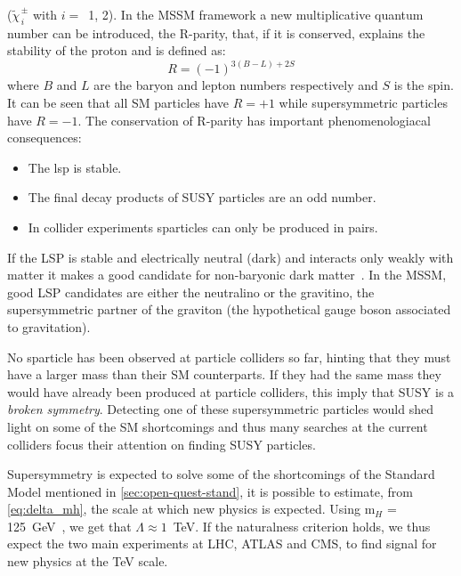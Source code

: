 ($\widetilde{\chi}^{\, \pm}_{\, i}$ with $i = $~1, 2). In the MSSM framework a
new multiplicative quantum number can be introduced, the R-parity, that, if it
is conserved, explains the stability of the proton and is defined as:
\begin{equation}
  \label{eq:54}
  R = (-1)^{3(B - L) + 2S}
\end{equation}
where $B$ and $L$ are the baryon and lepton numbers respectively and $S$ is the
spin. It can be seen that all SM particles have $R = + 1$ while supersymmetric
particles have $R = -1$. The conservation of R-parity has important
phenomenologiacal consequences:
\begin{itemize}
\item The \gls{lsp} is stable.
\item The final decay products of SUSY particles are an odd number.
\item In collider experiments sparticles can only be produced in pairs.
\end{itemize}
If the LSP is stable and electrically neutral (dark) and interacts only weakly
with matter it makes a good candidate for non-baryonic dark
matter~\cite{WIMPS}. In the MSSM, good LSP candidates are either the neutralino
or the gravitino, the supersymmetric partner of the graviton (the hypothetical
gauge boson associated to gravitation).

No sparticle has been observed at particle colliders so far, hinting that they
must have a larger mass than their SM counterparts. If they had the same mass
they would have already been produced at particle colliders, this imply that SUSY is
a \emph{broken symmetry}. Detecting one of these supersymmetric particles would
shed light on some of the SM shortcomings and thus many searches at the current
colliders focus their attention on finding SUSY particles.

Supersymmetry is expected to solve some of the shortcomings of the Standard
Model mentioned in \cref{sec:open-quest-stand}, it is possible to estimate, from
\cref{eq:delta_mh}, the scale at which new physics is expected. Using m$_H$ =
125~GeV~\cite{PDG}, we get that $\Lambda \approx 1$~TeV. If the naturalness
criterion holds, we thus expect the two main experiments at LHC, ATLAS and CMS,
to find signal for new physics at the TeV scale.

